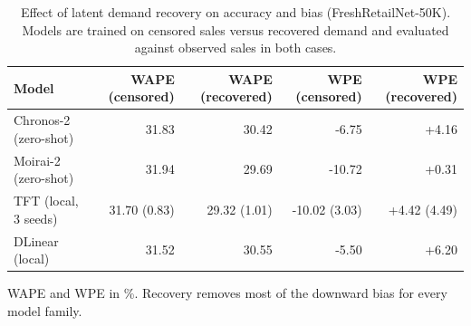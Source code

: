\begin{table}[t]
\centering
\small
\caption{Effect of latent demand recovery on accuracy and bias (FreshRetailNet-50K). Models are trained on censored sales versus recovered demand and evaluated against observed sales in both cases.}
\label{tab:table7_censoring}
\begin{tabular}{lrrrr}
\toprule
Model & WAPE (censored) & WAPE (recovered) & WPE (censored) & WPE (recovered) \\
\midrule
Chronos-2 (zero-shot) & 31.83 & 30.42 & -6.75 & +4.16 \\
Moirai-2 (zero-shot) & 31.94 & 29.69 & -10.72 & +0.31 \\
TFT (local, 3 seeds) & 31.70 (0.83) & 29.32 (1.01) & -10.02 (3.03) & +4.42 (4.49) \\
DLinear (local) & 31.52 & 30.55 & -5.50 & +6.20 \\
\bottomrule
\end{tabular}
\begin{tablenotes}\footnotesize
\item WAPE and WPE in \%. Recovery removes most of the downward bias for every model family.
\end{tablenotes}
\end{table}
